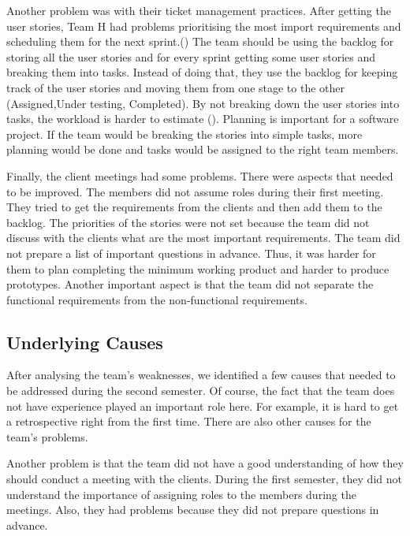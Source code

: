 \documentclass[11pt]{article}
\begin{document}
\par
Another problem was with their ticket management practices. After getting the user stories, Team H had problems prioritising the most import requirements and scheduling them for the next sprint.(\citet{prioritise}) The team should be using the backlog for storing all the user stories and for every sprint getting some user stories and breaking them into tasks. Instead of doing that, they use the backlog for keeping track of the user stories and moving them from one stage to the other (Assigned,Under testing, Completed). By not breaking down the user stories into tasks, the workload is harder to estimate (\citet[Chapter~4]{softengbook}). Planning is important for a software project. If the team would be breaking the stories into simple tasks, more planning would be done and tasks would be assigned to the right team members.

\par
Finally, the client meetings had some problems. There were aspects that needed to be improved. The members did not assume roles during their first meeting. They tried to get the requirements from the clients and then add them to the backlog. The priorities of the stories were not set because the team did not discuss with the clients what are the most important requirements. The team did not prepare a list of important questions in advance. Thus, it was harder for them to plan completing the minimum working product and harder to produce prototypes. Another important aspect is that the team did not separate the functional requirements from the non-functional requirements.


\subsection*{Underlying Causes}
\par
After analysing the team's weaknesses, we identified a few causes that needed to be addressed during the second semester. Of course, the fact that the team does not have experience played an important role here. For example, it is hard to get a retrospective right from the first time. There are also other causes for the team's problems. 

\par
Another problem is that the team did not have a good understanding of how they should conduct a meeting with the clients. During the first semester, they did not understand the importance of assigning roles to the members during the meetings. Also, they had problems because they did not prepare questions in advance.
\end{document}

